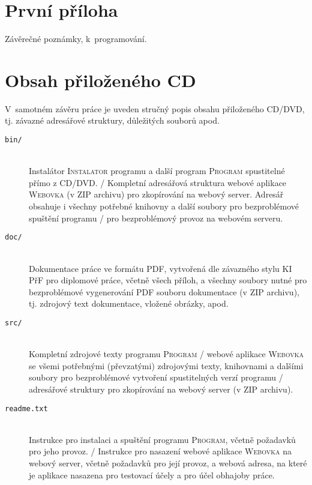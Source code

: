 \documentclass[12pt]{article}
\begin{document}
\newpage
\appendix

\section{První příloha} \label{PrvniPriloha}
Závěrečné poznámky, k~programování.

\newpage
\section{Obsah přiloženého CD} \label{ObsahCD}
V~samotném závěru práce je uveden stručný popis obsahu přiloženého
CD/DVD, tj. závazné adresářové struktury, důležitých souborů apod.

\begin{description}

\item[\texttt{bin/}] \hfill \\
Instalátor \textsc{Instalator} programu a další program
\textsc{Program} spustitelné přímo z CD/DVD. / Kompletní adresářová
struktura webové aplikace \textsc{Webovka} (v ZIP archivu) pro
zkopírování na webový server. Adresář obsahuje i všechny potřebné
knihovny a další soubory pro bezproblémové spuštění programu / pro
bezproblémový provoz na webovém serveru.

\item[\texttt{doc/}] \hfill \\
Dokumentace práce ve formátu PDF, vytvořená dle závazného stylu KI PřF
pro diplomové práce, včetně všech příloh, a všechny soubory nutné pro
bezproblémové vygenerování PDF souboru dokumentace (v ZIP archivu),
tj. zdrojový text dokumentace, vložené obrázky, apod.

\item[\texttt{src/}] \hfill \\
Kompletní zdrojové texty programu \textsc{Program} / webové aplikace
\textsc{Webovka} se všemi potřebnými (převzatými) zdrojovými texty,
knihovnami a dalšími soubory pro bezproblémové vytvoření spustitelných
verzí programu / adresářové struktury pro zkopírování na webový server
(v ZIP archivu).

\item[\texttt{readme.txt}] \hfill \\
Instrukce pro instalaci a spuštění programu \textsc{Program}, včetně
požadavků pro jeho provoz. / Instrukce pro nasazení webové aplikace
\textsc{Webovka} na webový server, včetně požadavků pro její provoz, a
webová adresa, na které je aplikace nasazena pro testovací účely a pro
účel obhajoby práce.

\end{description}
\end{document}

